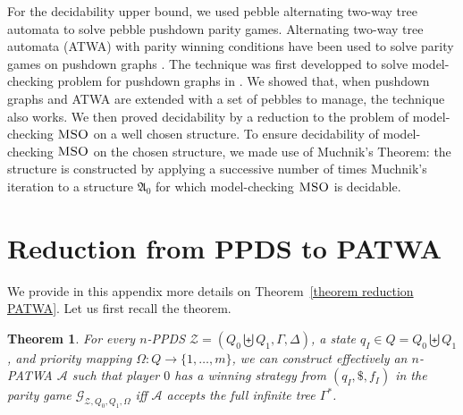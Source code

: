 \documentclass[a4paper,UKenglish,cleveref, autoref, thm-restate]{lipics-v2021}
\newtheorem*{theorem*}{Theorem}
\newcommand{\MSO}{\textsc{MSO}}
\begin{document}
	For the decidability upper bound, we  used pebble alternating two-way tree automata to solve pebble pushdown parity games.
Alternating two-way tree automata (ATWA) with parity winning conditions have been used to solve parity games on pushdown graphs \cite{cachat2002two}. The technique was first developped to solve model-checking problem for pushdown graphs in \cite{kupferman2000automata}. 
We showed that, when pushdown graphs and ATWA are extended with a set of pebbles to manage, the technique
also works.
We then proved decidability 
by %
a reduction
 to the problem of model-checking $\MSO$ on a well chosen structure. To ensure decidability of model-checking $\MSO$ on the chosen structure, we made use of 
Muchnik's Theorem: the structure is constructed by applying a successive number of times Muchnik's iteration to a structure $\mathfrak{A}_0$ for which model-checking $\MSO$ is decidable.













\appendix




\section{Reduction from PPDS to PATWA}\label{appendix tree reduction}

We provide in this appendix more details on Theorem~\ref{theorem reduction PATWA}. Let us first recall the theorem.

\begin{theorem*}
For every $n$-PPDS $\mathcal{Z} = (Q_0 \biguplus Q_1, \Gamma,\Delta)$, 
a state $q_I \in Q = Q_0 \biguplus Q_1$,
and priority mapping $\Omega: Q \to \{1, \ldots, m\}$,
we can construct 
effectively
an $n$-PATWA $\mathcal{A}$ 
such that
player $0$ has a winning strategy from $(q_I, \$, f_I)$ in the parity game 
$\mathcal{G}_{\mathcal{Z},Q_0,Q_1,\Omega}$
iff
$\mathcal{A}$ accepts the full infinite tree $\Gamma^*$.
\end{theorem*}
\end{document}
